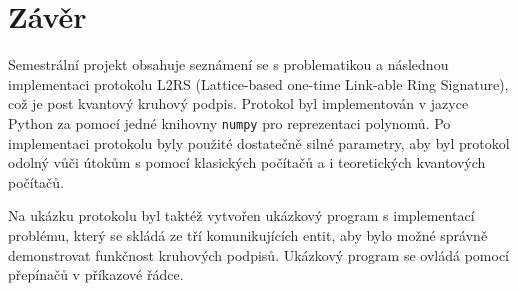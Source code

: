 \chapter*{Závěr}
{}

Semestrální projekt obsahuje seznámení se s problematikou a následnou implementaci protokolu L2RS (Lattice-based one-time Link-able Ring Signature), což je post kvantový kruhový podpis. Protokol byl implementován v jazyce Python za pomocí jedné knihovny \texttt{numpy} pro reprezentaci polynomů. Po implementaci protokolu byly použité dostatečně silné parametry, aby byl protokol odolný vůči útokům s pomocí klasických počítačů a i teoretických kvantových počítačů. 

Na ukázku protokolu byl taktéž vytvořen ukázkový program s implementací problému, který se skládá ze tří komunikujících entit, aby bylo možné správně demonstrovat funkčnost kruhových podpisů. Ukázkový program se ovládá pomocí přepínačů v příkazové řádce. 
